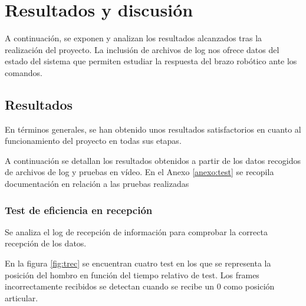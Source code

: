 \chapter{Resultados y discusión}

A continuación, se exponen y analizan los resultados alcanzados tras la realización del proyecto. La inclusión de archivos de log nos ofrece datos del estado del sistema que permiten estudiar la respuesta del brazo robótico ante los comandos.

\section{Resultados}

En términos generales, se han obtenido unos resultados satisfactorios en cuanto al funcionamiento del proyecto en todas sus etapas. 

A continuación se detallan los resultados obtenidos a partir de los datos recogidos de archivos de log y pruebas en vídeo. En el Anexo \ref{anexo:test} se recopila documentación en relación a las pruebas realizadas

\subsection{Test de eficiencia en recepción}

Se analiza el log de recepción de información para comprobar la correcta recepción de los datos.

En la figura \ref{fig:trec} se encuentran cuatro test en los que se representa la posición del hombro en función del tiempo relativo de test. Los frames incorrectamente recibidos se detectan cuando se recibe un 0 como posición articular.

